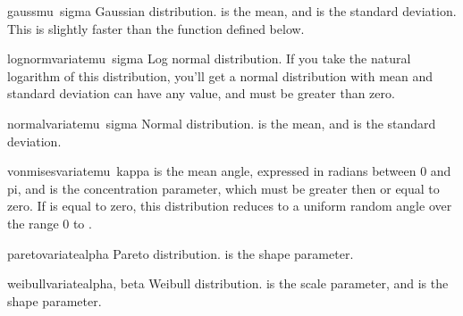 \begin{funcdesc}{gauss}{mu\, sigma}
Gaussian distribution.   is the mean, and  is the
standard deviation.  This is slightly faster than the
 function defined below.
\end{funcdesc}

\begin{funcdesc}{lognormvariate}{mu\, sigma}
Log normal distribution.  If you take the natural logarithm of this
distribution, you'll get a normal distribution with mean  and
standard deviation    can have any value, and 
must be greater than zero.  
\end{funcdesc}

\begin{funcdesc}{normalvariate}{mu\, sigma}
Normal distribution.   is the mean, and  is the
standard deviation.
\end{funcdesc}

\begin{funcdesc}{vonmisesvariate}{mu\, kappa}
 is the mean angle, expressed in radians between 0 and pi,
and  is the concentration parameter, which must be greater
then or equal to zero.  If  is equal to zero, this
distribution reduces to a uniform random angle over the range 0 to
.
\end{funcdesc}

\begin{funcdesc}{paretovariate}{alpha}
Pareto distribution.   is the shape parameter.
\end{funcdesc}

\begin{funcdesc}{weibullvariate}{alpha, beta}
Weibull distribution.   is the scale parameter, and
 is the shape parameter.
\end{funcdesc}

\begin{seealso}
\end{seealso}
